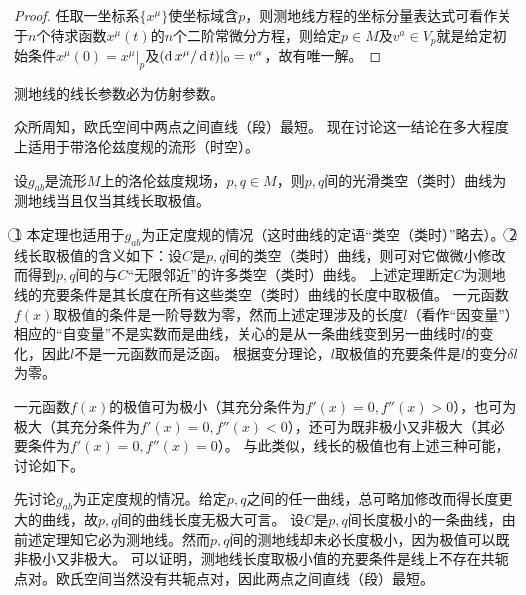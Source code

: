 \begin{proof}
任取一坐标系$\{x^\mu\}$使坐标域含$p$，则测地线方程的坐标分量表达式可看作关于$n$个待求函数$x^\mu(t)$的$n$个二阶常微分方程，则给定$p \in M$及$v^a \in V_p$就是给定初始条件$x^\mu(0) = x^\mu|_p$及$(\operatorname{d} x^\mu / \operatorname{d} t)|_0 = v^a$，故有唯一解。
\end{proof}

\begin{theorem}
测地线的线长参数必为仿射参数。
\end{theorem}

众所周知，欧氏空间中两点之间直线（段）最短。
现在讨论这一结论在多大程度上适用于带洛伦兹度规的流形（时空）。

\begin{theorem}
设$g_{ab}$是流形$M$上的洛伦兹度规场，$p, q \in M$，则$p, q$间的光滑类空（类时）曲线为测地线当且仅当其线长取极值。
\end{theorem}

\begin{note}
\textcircled{1} 本定理也适用于$g_{ab}$为正定度规的情况（这时曲线的定语``类空（类时）''略去）。
\textcircled{2} 线长取极值的含义如下：设$C$是$p, q$间的类空（类时）曲线，则可对它做微小修改而得到$p, q$间的与$C$``无限邻近''的许多类空（类时）曲线。
上述定理断定$C$为测地线的充要条件是其长度在所有这些类空（类时）曲线的长度中取极值。
一元函数$f(x)$取极值的条件是一阶导数为零，然而上述定理涉及的长度$l$（看作``因变量''）相应的``自变量''不是实数而是曲线，关心的是从一条曲线变到另一曲线时$l$的变化，因此$l$不是一元函数而是泛函。
根据变分理论，$l$取极值的充要条件是$l$的变分$\delta l$为零。
\end{note}

一元函数$f(x)$的极值可为极小（其充分条件为$f'(x) = 0, f''(x) > 0$），也可为极大（其充分条件为$f'(x) = 0, f''(x) < 0$），还可为既非极小又非极大（其必要条件为$f'(x) = 0, f''(x) = 0$）。
与此类似，线长的极值也有上述三种可能，讨论如下。

先讨论$g_{ab}$为正定度规的情况。给定$p, q$之间的任一曲线，总可略加修改而得长度更大的曲线，故$p, q$间的曲线长度无极大可言。
设$C$是$p, q$间长度极小的一条曲线，由前述定理知它必为测地线。然而$p, q$间的测地线却未必长度极小，因为极值可以既非极小又非极大。
可以证明，测地线长度取极小值的充要条件是线上不存在共轭点对。欧氏空间当然没有共轭点对，因此两点之间直线（段）最短。


